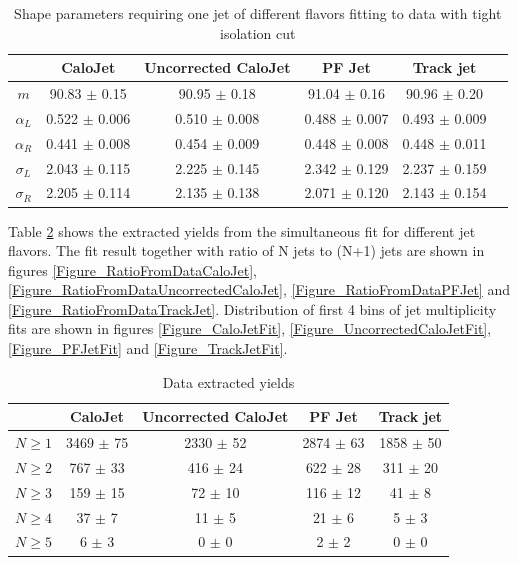 \documentclass{cmspaper}
\begin{document}
\begin{table}[htbp]
\caption{Shape parameters requiring one jet of different flavors fitting to data with tight isolation cut}
\centering
   \begin{tabular}{|c|c|c|c|c|c|}
      \hline
      & CaloJet & Uncorrected CaloJet & PF Jet & Track jet \\\hline
      $m$ & 90.83 $\pm$ 0.15 & 90.95 $\pm$ 0.18 & 91.04 $\pm$ 0.16 & 90.96 $\pm$ 0.20 \\\hline
      $\alpha_L$ & 0.522 $\pm$ 0.006 & 0.510 $\pm$ 0.008 & 0.488 $\pm$ 0.007 & 0.493 $\pm$ 0.009 \\\hline
      $\alpha_R$ & 0.441 $\pm$ 0.008 & 0.454 $\pm$ 0.009 & 0.448 $\pm$ 0.008 & 0.448 $\pm$ 0.011 \\\hline
      $\sigma_L$ & 2.043 $\pm$ 0.115 & 2.225 $\pm$ 0.145 & 2.342 $\pm$ 0.129 & 2.237 $\pm$ 0.159 \\\hline
      $\sigma_R$ & 2.205 $\pm$ 0.114 & 2.135 $\pm$ 0.138 & 2.071 $\pm$ 0.120 & 2.143 $\pm$ 0.154 \\\hline
   \end{tabular}
   \label{Table_DataAlphaL}
\end{table}

Table \ref{Table_DataExtractedYields} shows the extracted yields from the simultaneous fit for different jet flavors.
The fit result together with ratio of N jets to (N+1) jets are shown in figures
\ref{Figure_RatioFromDataCaloJet}, \ref{Figure_RatioFromDataUncorrectedCaloJet}, \ref{Figure_RatioFromDataPFJet}
and \ref{Figure_RatioFromDataTrackJet}.
Distribution of first 4 bins of jet multiplicity fits are shown in figures \ref{Figure_CaloJetFit}, \ref{Figure_UncorrectedCaloJetFit},
\ref{Figure_PFJetFit} and \ref{Figure_TrackJetFit}.

\begin{table}
\caption{Data extracted yields}
\centering
   \begin{tabular}{|c|c|c|c|c|}
      \hline
      & CaloJet & Uncorrected CaloJet & PF Jet & Track jet \\\hline
      $N \ge 1$ & 3469 $\pm$ 75 & 2330 $\pm$ 52 & 2874 $\pm$ 63 & 1858 $\pm$ 50 \\\hline
      $N \ge 2$ & 767 $\pm$ 33 & 416 $\pm$ 24 & 622 $\pm$ 28 & 311 $\pm$ 20 \\\hline
      $N \ge 3$ & 159 $\pm$ 15 & 72 $\pm$ 10 & 116 $\pm$ 12 & 41 $\pm$ 8 \\\hline
      $N \ge 4$ & 37 $\pm$ 7 & 11 $\pm$ 5 & 21 $\pm$ 6 & 5 $\pm$ 3 \\\hline
      $N \ge 5$ & 6 $\pm$ 3 & 0 $\pm$ 0 & 2 $\pm$ 2 & 0 $\pm$ 0 \\\hline
   \end{tabular}
   \label{Table_DataExtractedYields}
\end{table}
\end{document}

